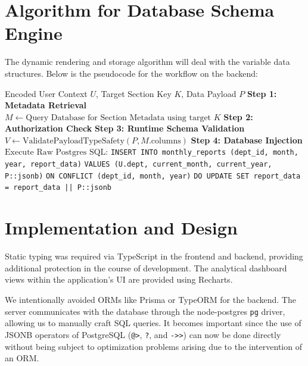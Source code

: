 \documentclass[conference]{IEEEtran}
\begin{document}
\section{Algorithm for Database Schema Engine}
The dynamic rendering and storage algorithm will deal with the variable data structures. Below is the pseudocode for the workflow on the backend:

\begin{algorithm}
\caption{Dynamic JSONB Schema Storage \& Rendering}
\begin{algorithmic}[1]
\REQUIRE Encoded User Context $U$, Target Section Key $K$, Data Payload $P$
\STATE \textbf{Step 1: Metadata Retrieval}
\STATE $M \leftarrow \text{Query Database for Section Metadata using target } K$
\STATE \textbf{Step 2: Authorization Check}
    \RETURN {}
\ENDIF
\STATE \textbf{Step 3: Runtime Schema Validation}
\STATE $V \leftarrow \text{ValidatePayloadTypeSafety}(P, M.\text{columns})$
    \RETURN {}
\ENDIF
\STATE \textbf{Step 4: Database Injection}
\STATE $\text{Execute Raw Postgres SQL:}$
\STATE \texttt{INSERT INTO monthly\_reports (dept\_id, month, year, report\_data)}
\STATE \texttt{VALUES (U.dept, current\_month, current\_year, P::jsonb)}
\STATE \texttt{ON CONFLICT (dept\_id, month, year)}
\STATE \texttt{DO UPDATE SET report\_data = report\_data || P::jsonb}
\RETURN {}
\end{algorithmic}
\end{algorithm}

\section{Implementation and Design}
Static typing was required via TypeScript in the frontend and backend, providing additional protection in the course of development. The analytical dashboard views within the application's UI are provided using Recharts.

We intentionally avoided ORMs like Prisma or TypeORM for the backend. The server communicates with the database through the node-postgres \texttt{pg} driver, allowing us to manually craft SQL queries. It becomes important since the use of JSONB operators of PostgreSQL (\texttt{@>}, \texttt{?}, and \texttt{->>}) can now be done directly without being subject to optimization problems arising due to the intervention of an ORM.
\end{document}
